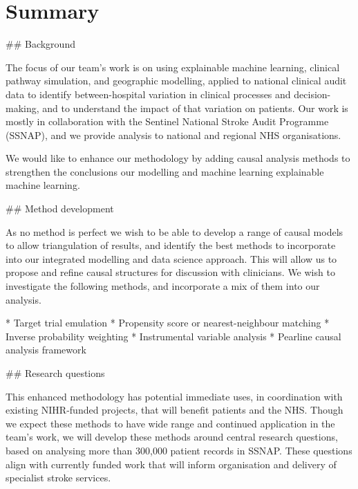 \section*{Summary}
\begin{markdown}

## Background

The focus of our team's work is on using explainable machine learning, clinical pathway simulation, and geographic modelling, applied to national clinical audit data to identify between-hospital variation in clinical processes and decision-making, and to understand the impact of that variation on patients. Our work is mostly in collaboration with the Sentinel National Stroke Audit Programme (SSNAP), and we provide analysis to national and regional NHS organisations.

We would like to enhance our methodology by adding causal analysis methods to strengthen the conclusions our modelling and machine learning explainable machine learning. 

## Method development

As no method is perfect we wish to be able to develop a range of causal models to allow triangulation of results, and identify the best methods to incorporate into our integrated modelling and data science approach. This will allow us to propose and refine causal structures for discussion with clinicians. We wish to investigate the following methods, and incorporate a mix of them into our analysis.

* Target trial emulation
* Propensity score or nearest-neighbour matching
* Inverse probability weighting
* Instrumental variable analysis
* Pearline causal analysis framework


## Research questions

This enhanced methodology has potential immediate uses, in coordination with existing NIHR-funded projects, that will benefit patients and the NHS. Though we expect these methods to have wide range and continued application in the team's work, we will develop these methods around central research questions, based on analysing more than 300,000 patient records in SSNAP. These questions align with currently funded work that will inform organisation and delivery of specialist stroke services.


\end{markdown}

